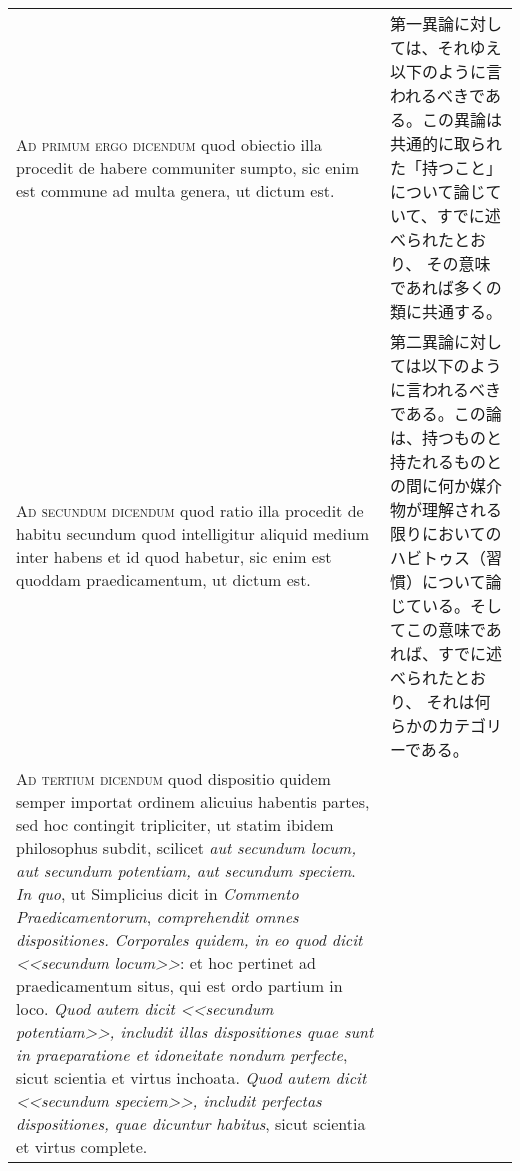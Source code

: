 \documentclass[10pt]{jsarticle} %
\begin{document}
\schema
{
}
{
  \schema
  {
  }
  {
  }
  {}
}


\begin{longtable}{p{21em}p{21em}}


{\scshape Ad primum ergo dicendum} quod obiectio illa procedit de habere
communiter sumpto, sic enim est commune ad multa genera, ut dictum
est.

&

第一異論に対しては、それゆえ以下のように言われるべきである。この異論は
共通的に取られた「持つこと」について論じていて、すでに述べられたとおり、
その意味であれば多くの類に共通する。

\\



{\scshape Ad secundum dicendum} quod ratio illa procedit de habitu
secundum quod intelligitur aliquid medium inter habens et id quod
habetur, sic enim est quoddam praedicamentum, ut dictum est.

&

第二異論に対しては以下のように言われるべきである。この論は、持つものと
持たれるものとの間に何か媒介物が理解される限りにおいてのハビトゥス（習
慣）について論じている。そしてこの意味であれば、すでに述べられたとおり、
それは何らかのカテゴリーである。


\\

 {\scshape Ad tertium dicendum} quod dispositio quidem semper importat
ordinem alicuius habentis partes, sed hoc contingit tripliciter, ut
statim ibidem philosophus subdit, scilicet {\itshape aut secundum
locum, aut secundum potentiam, aut secundum speciem}. {\itshape In
quo}, ut Simplicius dicit in {\itshape Commento Praedicamentorum},
{\itshape comprehendit omnes dispositiones. Corporales quidem, in eo
quod dicit <<secundum locum>>}: et hoc pertinet ad praedicamentum
situs, qui est ordo partium in loco. {\itshape Quod autem dicit
<<secundum potentiam>>, includit illas dispositiones quae sunt in
praeparatione et idoneitate nondum perfecte}, sicut scientia et virtus
inchoata. {\itshape Quod autem dicit <<secundum speciem>>, includit
perfectas dispositiones, quae dicuntur habitus}, sicut scientia et
virtus complete.


\end{longtable}
\end{document}
